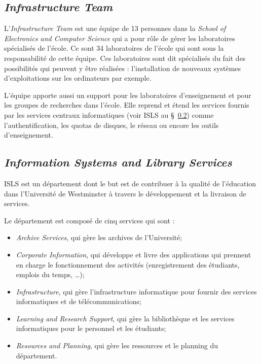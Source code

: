 \subsection{\textit{Infrastructure Team}}

L'\textit{Infrastructure Team} est une \'equipe de 13 personnes dans la \textit{School of Electronics and Computer Science} qui a pour r\^ole de g\'erer les laboratoires sp\'ecialis\'es de l'\'ecole.
Ce sont 34 laboratoires de l'\'ecole qui sont sous la responsabilit\'e de cette \'equipe.
Ces laboratoires sont dit sp\'ecialis\'es du fait des possibilit\'es qui peuvent y \^etre r\'ealis\'ees : l'installation de nouveaux syst\`emes d'exploitations sur les ordinateurs par exemple.

L'\'equipe apporte aussi un support pour les laboratoires d'enseignement et pour les groupes de recherches dans l'\'ecole.
Elle reprend et \'etend les services fournis par les services centraux informatiques (voir ISLS au \S~\ref{section:ISLS}) comme l'authentification, les quotas de disques, le r\'eseau ou encore les outils d'enseignement.

\subsection{\textit{Information Systems and Library Services}}
\label{section:ISLS}

ISLS est un d\'epartement dont le but est de contribuer \`a la qualit\'e de l'\'education dans l'Universit\'e de Westminster \`a travers le d\'eveloppement et la livraison de services.

\noindent Le d\'epartement est compos\'e de cinq services qui sont :

\begin{itemize}
	\item \textit{Archive Services}, qui g\`ere les archives de l'Universit\'e;
	\item \textit{Corporate Information}, qui d\'eveloppe et livre des applications qui prennent en charge le fonctionnement des activit\'es (enregistrement des \'etudiants, emplois du temps, \ldots);
	\item \textit{Infrastructure}, qui g\`ere l'infrastructure informatique pour fournir des services informatiques et de t\'el\'ecommunications;
	\item \textit{Learning and Research Support}, qui g\`ere la biblioth\`eque et les services informatiques pour le personnel et les \'etudiants;
	\item \textit{Resources and Planning}, qui g\`ere les ressources et le planning du d\'epartement.

\end{itemize}

